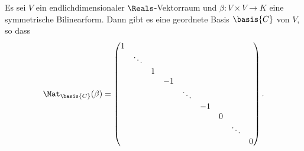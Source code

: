 \begin{corollary}
  Es sei $V$ ein endlichdimensionaler $\Reals$-Vektorraum und $\beta \colon V \times V \to K$ eine symmetrische Bilinearform.
  Dann gibt es eine geordnete Basis $\basis{C}$ von $V$, so dass
  \[
    \Mat_\basis{C}(\beta)
    =
    \begin{pmatrix}
      1 &         &   &     &         &     &   &         &   \\                                                        
        & \ddots  &   &     &         &     &   &         &   \\
        &         & 1 &     &         &     &   &         &   \\
        &         &   & -1  &         &     &   &         &   \\
        &         &   &     & \ddots  &     &   &         &   \\
        &         &   &     &         & -1  &   &         &   \\
        &         &   &     &         &     & 0 &         &   \\
        &         &   &     &         &     &   & \ddots  &   \\
        &         &   &     &         &     &   &         & 0
    \end{pmatrix}.
  \]
\end{corollary}






















































